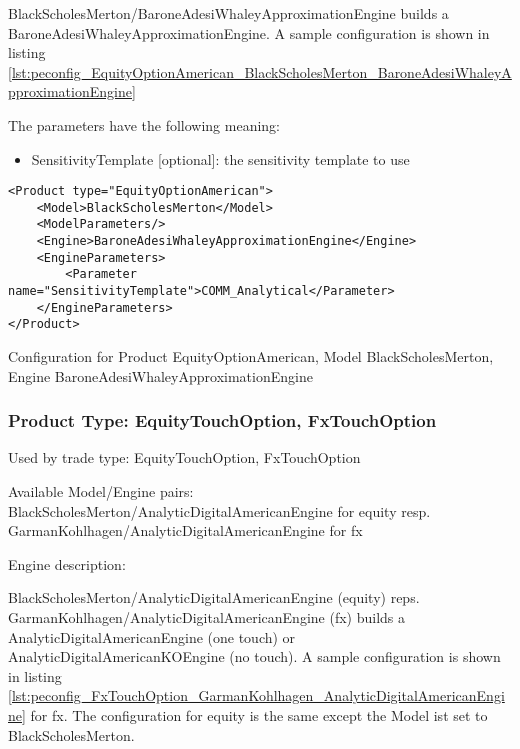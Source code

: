 BlackScholesMerton/BaroneAdesiWhaleyApproximationEngine builds a BaroneAdesiWhaleyApproximationEngine. A sample configuration is shown in listing
\ref{lst:peconfig_EquityOptionAmerican_BlackScholesMerton_BaroneAdesiWhaleyApproximationEngine}

The parameters have the following meaning:

\begin{itemize}
\item SensitivityTemplate [optional]: the sensitivity template to use 
\end{itemize}

\begin{longlisting}
\begin{verbatim}
<Product type="EquityOptionAmerican">
    <Model>BlackScholesMerton</Model>
    <ModelParameters/>
    <Engine>BaroneAdesiWhaleyApproximationEngine</Engine>
    <EngineParameters>
        <Parameter name="SensitivityTemplate">COMM_Analytical</Parameter>
    </EngineParameters>
</Product>
\end{verbatim}
\caption{Configuration for Product EquityOptionAmerican, Model BlackScholesMerton, Engine BaroneAdesiWhaleyApproximationEngine}
\label{lst:peconfig_EquityOptionAmerican_BlackScholesMerton_BaroneAdesiWhaleyApproximationEngine}
\end{longlisting}

\subsubsection{Product Type: EquityTouchOption, FxTouchOption}

Used by trade type: EquityTouchOption, FxTouchOption

Available Model/Engine pairs: BlackScholesMerton/AnalyticDigitalAmericanEngine for equity
resp. GarmanKohlhagen/AnalyticDigitalAmericanEngine for fx

Engine description:

BlackScholesMerton/AnalyticDigitalAmericanEngine (equity) reps. GarmanKohlhagen/AnalyticDigitalAmericanEngine (fx)
builds a AnalyticDigitalAmericanEngine (one touch) or AnalyticDigitalAmericanKOEngine (no touch). A sample configuration
is shown in listing \ref{lst:peconfig_FxTouchOption_GarmanKohlhagen_AnalyticDigitalAmericanEngine} for fx. The
configuration for equity is the same except the Model ist set to BlackScholesMerton.

